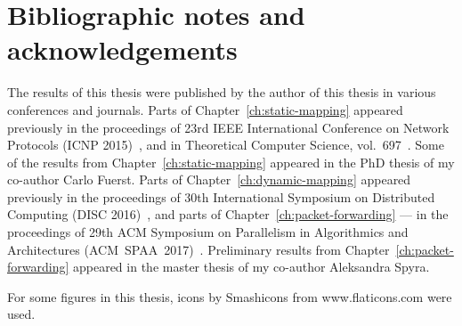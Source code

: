 \section{Bibliographic notes and acknowledgements}

The results of this thesis were published by the author of this thesis in various conferences and journals.
Parts of Chapter~\ref{ch:static-mapping} appeared previously in the proceedings of 23rd IEEE International Conference on Network Protocols (ICNP 2015)~\cite{my-icnp},
and in Theoretical Computer Science, vol.~697~\cite{my-tcs}.
Some of the results from Chapter~\ref{ch:static-mapping} appeared in the PhD thesis of my co-author Carlo Fuerst.
Parts of Chapter~\ref{ch:dynamic-mapping} appeared previously in the proceedings of 30th International Symposium on Distributed Computing (DISC 2016)~\cite{my-disc}, and parts of Chapter~\ref{ch:packet-forwarding} --- in the proceedings of 29th ACM Symposium on Parallelism in Algorithmics and Architectures (ACM~SPAA~2017)~\cite{my-spaa}.
Preliminary results from Chapter~\ref{ch:packet-forwarding} appeared in the master thesis of my co-author Aleksandra Spyra.

For some figures in this thesis, icons by Smashicons from www.flaticons.com were used.